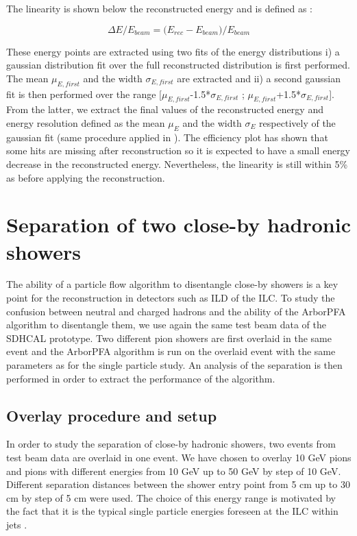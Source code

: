 \documentclass[cits]{JINST}
\begin{document}
The linearity is shown below the reconstructed energy and is defined as :

\begin{equation}
  \Delta E/E_{beam} = \Big(E_{rec} - E_{beam}\Big)/E_{beam}
\end{equation}

These energy points are extracted using two fits of the energy distributions i) a gaussian distribution fit over the full reconstructed distribution is first performed. The mean $\mu_{E,first}$ and the width $\sigma_{E,first}$ are extracted and ii) a second gaussian fit is then performed over the range [$\mu_{E,first}$-1.5*$\sigma_{E,first}$ ; $\mu_{E,first}$+1.5*$\sigma_{E,first}$]. From the latter, we extract the final values of the reconstructed energy and energy resolution defined as the mean $\mu_E$ and the width $\sigma_E$ respectively of the gaussian fit (same procedure applied in \cite{sdhcal-paper}). The efficiency plot has shown that some hits are missing after reconstruction so it is expected to have a small energy decrease in the reconstructed energy. Nevertheless, the linearity is still within 5\% as before applying the reconstruction.

\newpage
\section{Separation of two close-by hadronic showers}

The ability of a particle flow algorithm to disentangle close-by showers is a key point for the reconstruction in detectors such as ILD of the ILC. To study the confusion between neutral and charged hadrons and the ability of the ArborPFA algorithm to disentangle them, we use again the same test beam data of the SDHCAL prototype. Two different pion showers are first overlaid in the same event and the ArborPFA algorithm is run on the overlaid event with the same parameters as for the single particle study. An analysis of the separation is then performed in order to extract the performance of the algorithm.

\subsection{Overlay procedure and setup}

In order to study the separation of close-by hadronic showers, two events from test beam data are overlaid in one event. We have chosen to overlay 10 GeV pions and pions with different energies from 10 GeV up to 50 GeV by step of 10 GeV. Different separation distances between the shower entry point from 5 cm up to 30 cm by step of 5 cm were used. The choice of this energy range is motivated by the fact that it is the typical single particle energies foreseen at the ILC within jets \cite{ilc-tdr}.
\end{document}
